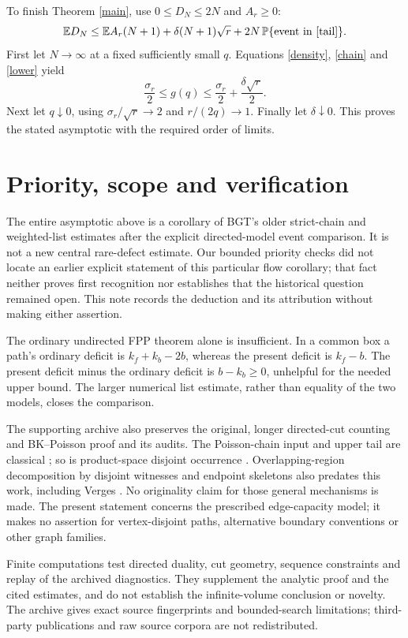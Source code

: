 \documentclass[11pt]{article}
\newcommand{\E}{\mathbb E}
\newcommand{\Prob}{\mathbb P}
\begin{document}
To finish Theorem \ref{main}, use $0\le D_N\le2N$ and $A_r\ge0$:
\[
 \E D_N\le\E A_r(N+1)+\delta(N+1)\sqrt r+
                 2N\,\Prob\{\text{event in \eqref{tail}}\}.
\]
First let $N\to\infty$ at a fixed sufficiently small $q$. Equations
\eqref{density}, \eqref{chain} and \eqref{lower} yield
\[
 \frac{\sigma_r}{2}\le g(q)
     \le\frac{\sigma_r}{2}+\frac{\delta\sqrt r}{2}.
\]
Next let $q\downarrow0$, using
$\sigma_r/\sqrt r\to2$ and $r/(2q)\to1$. Finally let $\delta\downarrow0$.
This proves the stated asymptotic with the required order of limits.

\section{Priority, scope and verification}

The entire asymptotic above is a corollary of BGT's older
strict-chain and weighted-list estimates after the explicit
directed-model event comparison. It is not a new central
rare-defect estimate. Our bounded priority checks did not locate
an earlier explicit statement of this particular flow corollary;
that fact neither proves first recognition nor establishes that the
historical question remained open. This note records the deduction
and its attribution without making either assertion.

The ordinary undirected FPP theorem alone is insufficient. In a
common box a path's ordinary deficit is $k_f+k_b-2b$, whereas the
present deficit is $k_f-b$. The present deficit minus the ordinary
deficit is $b-k_b\ge0$, unhelpful for the needed upper bound. The larger numerical
list estimate, rather than equality of the two models, closes the
comparison.

The supporting archive also preserves the original, longer
directed-cut counting and BK--Poisson proof and its audits. The
Poisson-chain input and upper tail are classical \cite{DZ}; so is
product-space disjoint occurrence \cite{BK}. Overlapping-region
decomposition by disjoint witnesses and endpoint skeletons also
predates this work, including Verges \cite[Lemma 2.5 and \S5.2]{Verges}.
No originality claim for those general mechanisms is made.
The present statement concerns the prescribed edge-capacity model;
it makes no assertion for vertex-disjoint paths, alternative
boundary conventions or other graph families.

Finite computations test directed duality, cut geometry, sequence
constraints and replay of the archived diagnostics. They supplement
the analytic proof and the cited estimates, and do not establish
the infinite-volume conclusion or novelty. The archive gives exact
source fingerprints and bounded-search limitations; third-party
publications and raw source corpora are not redistributed.
\end{document}
